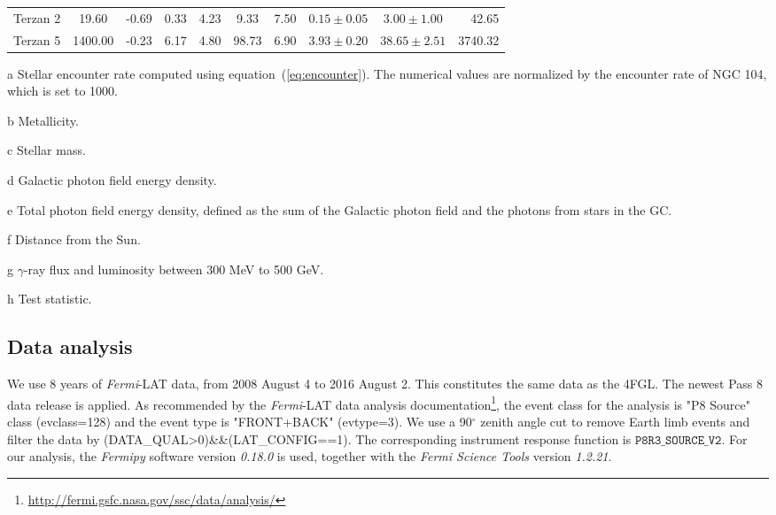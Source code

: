 \documentclass[doublespace,nopageskip]{VTthesis} %
\begin{document}
\begin{table}
\begin{threeparttable}
\begin{tabular}{lccccccccr}
Terzan 2 & 19.60 & -0.69 & 0.33 & 4.23 & 9.33 & 7.50 & $0.15 \pm 0.05$ & $3.00 \pm 1.00$ & 42.65\\
Terzan 5 & 1400.00 & -0.23 & 6.17 & 4.80 & 98.73 & 6.90 & $3.93 \pm 0.20$ & $38.65 \pm 2.51$ & 3740.32\\
\hline
\end{tabular}
\begin{tablenotes}
\item [a] Stellar encounter rate computed using equation~(\ref{eq:encounter}).
The numerical values are normalized by the encounter rate of NGC 104, which is set to 1000.
\item [b] Metallicity.
\item [c] Stellar mass.
\item [d] Galactic photon field energy density.
\item [e] Total photon field energy density, defined as the sum of the Galactic photon field and the photons from stars in the GC.
\item [f] Distance from the Sun.
\item [g] $\gamma$-ray flux and luminosity between 300 MeV to 500 GeV.
\item [h] Test statistic.
\end{tablenotes}
\end{threeparttable}
\end{table}

\subsection{Data analysis}\label{sec:data}

We use 8 years of \textit{Fermi}-LAT data, from 2008 August 4 to 2016 August 2. This constitutes the same data as the 4FGL. The newest Pass 8 data release is applied. As recommended by the \textit{Fermi}-LAT data analysis documentation\footnote{\url{http://fermi.gsfc.nasa.gov/ssc/data/analysis/}}, the event class for the analysis is "P8 Source" class (evclass=128) and the event type is "FRONT+BACK" (evtype=3). We use a 90$^{\circ}$ zenith angle cut to remove Earth limb events and filter the data by (DATA\_QUAL>0)\&\&(LAT\_CONFIG==1). The corresponding instrument response function is $\texttt{P8R3\_SOURCE\_V2}$. For our analysis, the \textit{Fermipy} software version \textit{0.18.0} is used, together with the \textit{Fermi Science Tools} version \textit{1.2.21}.
\end{document}
